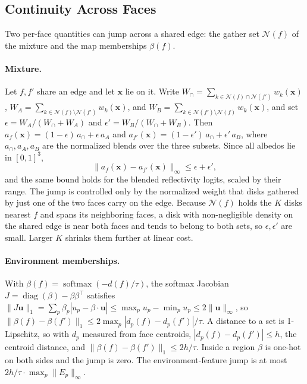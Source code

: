 \begin{addblock}
\subsection{Continuity Across Faces}
\label{app:continuity}
Two per-face quantities can jump across a shared edge: the gather set $\mathcal{N}(f)$ of the
mixture and the map memberships $\beta(f)$.

\paragraph{Mixture.} Let $f,f'$ share an edge and let $\mathbf{x}$ lie on it. Write
$W_\cap=\sum_{k\in\mathcal{N}(f)\cap\mathcal{N}(f')}w_k(\mathbf{x})$,
$W_A=\sum_{k\in\mathcal{N}(f)\setminus\mathcal{N}(f')}w_k(\mathbf{x})$, and
$W_B=\sum_{k\in\mathcal{N}(f')\setminus\mathcal{N}(f)}w_k(\mathbf{x})$, and set
$\epsilon=W_A/(W_\cap+W_A)$ and $\epsilon'=W_B/(W_\cap+W_B)$. Then
$a_f(\mathbf{x})=(1-\epsilon)\,a_\cap+\epsilon\,a_A$ and
$a_{f'}(\mathbf{x})=(1-\epsilon')\,a_\cap+\epsilon'\,a_B$, where $a_\cap,a_A,a_B$ are the normalized
blends over the three subsets. Since all albedos lie in $[0,1]^3$,
\begin{equation}
\big\|a_f(\mathbf{x})-a_{f'}(\mathbf{x})\big\|_\infty \le \epsilon+\epsilon',
\end{equation}
and the same bound holds for the blended reflectivity logits, scaled by their range. The jump is
controlled only by the normalized weight that disks gathered by just one of the two faces carry on
the edge. Because $\mathcal{N}(f)$ holds the $K$ disks nearest $f$ and spans its neighboring faces, a
disk with non-negligible density on the shared edge is near both faces and tends to belong to both
sets, so $\epsilon,\epsilon'$ are small. Larger $K$ shrinks them further at linear cost.

\paragraph{Environment memberships.} With $\beta(f)=\operatorname{softmax}(-d(f)/\tau)$, the
softmax Jacobian $J=\operatorname{diag}(\beta)-\beta\beta^\top$ satisfies
$\|J\mathbf{u}\|_1=\sum_p\beta_p|u_p-\beta\cdot\mathbf{u}|\le\max_p u_p-\min_p u_p\le2\|\mathbf{u}\|_\infty$,
so $\|\beta(f)-\beta(f')\|_1\le 2\max_p|d_p(f)-d_p(f')|/\tau$. A distance to a set is 1-Lipschitz,
so with $d_p$ measured from face centroids, $|d_p(f)-d_p(f')|\le h$, the centroid distance, and
$\|\beta(f)-\beta(f')\|_1\le 2h/\tau$. Inside a region $\beta$ is one-hot on both sides and the jump is
zero. The environment-feature jump is at most $2h/\tau\cdot\max_p\|E_p\|_\infty$.


\end{addblock}
